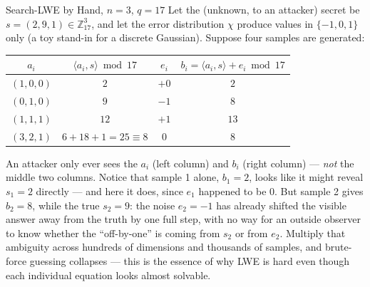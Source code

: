 \begin{exbox}{Search-LWE by Hand, $n=3$, $q=17$}
Let the (unknown, to an attacker) secret be $s = (2, 9, 1) \in \mathbb{Z}_{17}^3$, and let the error distribution $\chi$ produce values in $\{-1,0,1\}$ only (a toy stand-in for a discrete Gaussian). Suppose four samples are generated:
\begin{center}
\begin{tabular}{|c|c|c|c|}
\hline
$a_i$ & $\langle a_i, s\rangle \bmod 17$ & $e_i$ & $b_i = \langle a_i,s\rangle + e_i \bmod 17$ \\
\hline
$(1,0,0)$ & $2$ & $+0$ & $2$ \\
$(0,1,0)$ & $9$ & $-1$ & $8$ \\
$(1,1,1)$ & $12$ & $+1$ & $13$ \\
$(3,2,1)$ & $6+18+1=25\equiv 8$ & $0$ & $8$ \\
\hline
\end{tabular}
\end{center}
An attacker only ever sees the $a_i$ (left column) and $b_i$ (right column) --- \emph{not} the middle two columns. Notice that sample 1 alone, $b_1 = 2$, looks like it might reveal $s_1 = 2$ directly --- and here it does, since $e_1$ happened to be $0$. But sample 2 gives $b_2 = 8$, while the true $s_2 = 9$: the noise $e_2=-1$ has already shifted the visible answer away from the truth by one full step, with no way for an outside observer to know whether the ``off-by-one'' is coming from $s_2$ or from $e_2$. Multiply that ambiguity across hundreds of dimensions and thousands of samples, and brute-force guessing collapses --- this is the essence of why LWE is hard even though each individual equation looks almost solvable.
\end{exbox}

